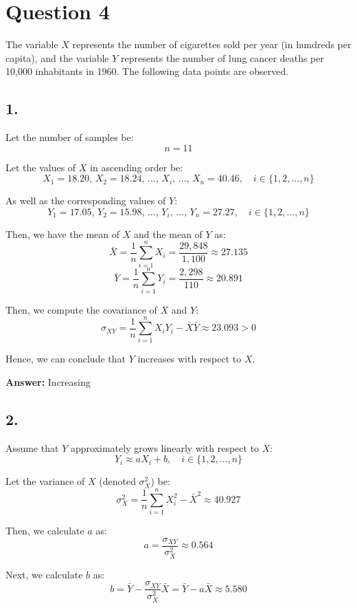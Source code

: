 \documentclass[12pt]{article}
\begin{document}
\section*{Question 4}

The variable \( X \) represents the number of cigarettes sold per year (in hundreds per capita), and the variable \( Y \) represents the number of lung cancer deaths per 10,000 inhabitants in 1960. The following data points are observed.

\subsection*{1.}

Let the number of samples be:
\[
n = 11
\]

Let the values of \( X \) in ascending order be:
\[
X_1 = 18.20, \, X_2 = 18.24, \, \dots, \, X_i, \, \dots, \, X_n = 40.46, \quad i \in \{1, 2, \dots, n\}
\]

As well as the corresponding values of \( Y \):
\[
Y_1 = 17.05, \, Y_2 = 15.98, \, \dots, \, Y_i, \, \dots, \, Y_n = 27.27, \quad i \in \{1, 2, \dots, n\}
\]

Then, we have the mean of \( X \) and the mean of \( Y \) as:
\[
\bar{X} = \frac{1}{n} \sum_{i=1}^n X_i = \frac{29,848}{1,100} \approx 27.135
\]
\[
\bar{Y} = \frac{1}{n} \sum_{i=1}^n Y_i = \frac{2,298}{110} \approx 20.891
\]

Then, we compute the covariance of \( X \) and \( Y \):
\[
\sigma_{XY} = \frac{1}{n} \sum_{i=1}^n X_i Y_i - \bar{X} \bar{Y} \approx 23.093 > 0
\]

Hence, we can conclude that \( Y \) increases with respect to \( X \).

\textbf{Answer:} Increasing

\subsection*{2.}

Assume that \( Y \) approximately grows linearly with respect to \( X \):
\[
Y_i \approx a X_i + b, \quad i \in \{1, 2, \dots, n\}
\]

Let the variance of \( X \) (denoted \( \sigma_X^2 \)) be:
\[
\sigma_X^2 = \frac{1}{n} \sum_{i=1}^n X_i^2 - \bar{X}^2 \approx 40.927
\]

Then, we calculate \( a \) as:
\[
a = \frac{\sigma_{XY}}{\sigma_X^2} \approx 0.564
\]

Next, we calculate \( b \) as:
\[
b = \bar{Y} - \frac{\sigma_{XY}}{\sigma_X^2} \bar{X} = \bar{Y} - a \bar{X} \approx 5.580
\]
\end{document}
